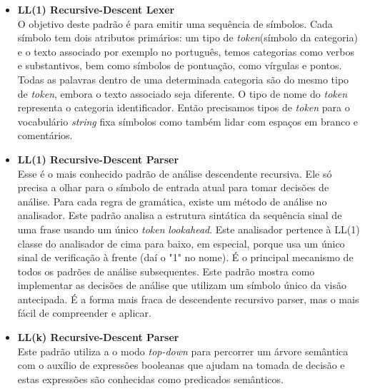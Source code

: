 \begin{itemize}
	\item \textbf{LL(1) Recursive-Descent Lexer}\\
	O objetivo deste padr\~{a}o \'{e} para emitir uma sequência de s\'{i}mbolos. Cada s\'{i}mbolo tem dois atributos prim\'{a}rios: um tipo de \textit{token}(s\'{i}mbolo da categoria) e o texto associado por exemplo 
	no português, temos categorias como verbos e substantivos, bem como s\'{i}mbolos de pontuaç\~{a}o, como v\'{i}rgulas e pontos. Todas as palavras dentro de uma determinada categoria s\~{a}o do mesmo tipo de \textit{token}, embora o texto associado seja diferente. O tipo de nome do \textit{token} representa o categoria identificador. Ent\~{a}o precisamos tipos de \textit{token} para o vocabul\'{a}rio \textit{string} fixa s\'{i}mbolos como tamb\'{e}m lidar com espaços em branco e coment\'{a}rios.
	\item \textbf{LL(1) Recursive-Descent Parser}\\
	Esse \'{e} o mais conhecido padr\~{a}o de an\'{a}lise descendente recursiva. Ele s\'{o} precisa	a olhar para o s\'{i}mbolo de entrada atual para tomar decis\~{o}es de an\'{a}lise. Para cada regra de gram\'{a}tica, existe um m\'{e}todo de an\'{a}lise no analisador. Este padr\~{a}o analisa a estrutura sint\'{a}tica da sequência sinal de uma frase usando um \'{u}nico \textit{token} \textit{lookahead}. Este analisador pertence à LL(1) classe do analisador de cima para baixo, em especial, porque usa um \'{u}nico sinal de verificaç\~{a}o à frente (da\'{i} o "1" no nome). É o principal mecanismo de todos os padr\~{o}es de an\'{a}lise subsequentes. Este padr\~{a}o mostra como implementar as decis\~{o}es de an\'{a}lise que utilizam um s\'{i}mbolo \'{u}nico da vis\~{a}o antecipada. É a forma mais fraca de descendente recursivo parser, mas o mais f\'{a}cil de compreender e aplicar.
	\item \textbf{LL(k) Recursive-Descent Parser}\\
	Este padr\~{a}o utiliza a o modo \textit{top-down} para percorrer um \'{a}rvore sem\^{a}ntica com o aux\'{i}lio de express\~{o}es booleanas que ajudam na tomada de decis\~{a}o e estas express\~{o}es s\~{a}o conhecidas como predicados sem\^{a}nticos.
	
\end{itemize}


%
